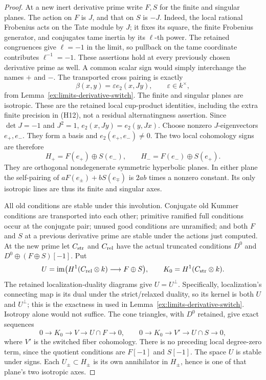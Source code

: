 \documentclass[11pt]{article}
\theoremstyle{definition}
\theoremstyle{remark}
\begin{document}
\begin{proof}
At a new inert derivative prime write $F,S$ for the finite and
singular planes. The action on $F$ is $J$, and that on $S$ is $-J$.
Indeed, the local rational Frobenius acts on the Tate module by $J$;
it fixes its square, the finite Frobenius generator, and conjugates
tame inertia by its $\ell$-th power. The retained congruences give
$\ell=-1$ in the limit, so pullback on the tame coordinate contributes
$\ell^{-1}=-1$. These assertions hold at every previously chosen
derivative prime as well. A common scalar sign would simply interchange
the names $+$ and $-$.
The transported cross pairing is exactly
\[
 \beta(x,y)=\varepsilon e_2(x,Jy),\qquad \varepsilon\in k^\times,
\]
from Lemma~\ref{ex:limits-derivative-switch}. The finite and singular
planes are isotropic. These are the retained local cup-product
identities, including the extra finite precision in (H12), not a
residual alternatingness assertion. Since $\det J=-1$ and $J^2=1$,
$e_2(x,Jy)=e_2(y,Jx)$. Choose nonzero $J$-eigenvectors $e_+,e_-$.
They form a basis and $e_2(e_+,e_-)\ne0$. The two local cohomology
signs are therefore
\[
 H_+=F(e_+)\oplus S(e_-),\qquad
 H_-=F(e_-)\oplus S(e_+).
\]
They are orthogonal nondegenerate symmetric hyperbolic planes.
In either plane the self-pairing of $aF(e_\pm)+bS(e_\mp)$ is
$2ab$ times a nonzero constant. Its only isotropic lines are thus
its finite and singular axes.

All old conditions are stable under this involution. Conjugate old
Kummer conditions are transported into each other; primitive ramified
full conditions occur at the conjugate pair; unused good conditions
are unramified; and both $F$ and $S$ at a previous derivative prime
are stable under the actions just computed. At the new prime let
$C_{\rm str}$ and $C_{\rm rel}$ have the actual truncated conditions
$D^0$ and $D^0\oplus(F\oplus S)[-1]$. Put
\[
 U=\operatorname{im}\bigl(H^1(C_{\rm rel}\otimes k)\longrightarrow
 F\oplus S\bigr),\qquad
 K_0=H^1(C_{\rm str}\otimes k).
\]
The retained localization-duality diagrams give $U=U^\perp$.
Specifically, localization's connecting map is its dual under the
strict/relaxed duality, so its kernel is both $U$ and $U^\perp$;
this is the exactness in \cite[6.3.3--6.3.4]{nekovar} used in
Lemma~\ref{ex:limits-derivative-switch}. Isotropy alone would not suffice.
The cone triangles, with $D^0$ retained, give exact sequences
\[
 0\longrightarrow K_0\longrightarrow V
   \longrightarrow U\cap F\longrightarrow0,
 \qquad
 0\longrightarrow K_0\longrightarrow V'
   \longrightarrow U\cap S\longrightarrow0,                 \tag{5.5a}
\]
where $V'$ is the switched fiber cohomology. There is no preceding
local degree-zero term, since the quotient conditions are
$F[-1]$ and $S[-1]$.
The space $U$ is stable under signs. Each $U_\pm\subset H_\pm$
is its own annihilator in $H_\pm$, hence is one of that plane's
two isotropic axes.


\end{proof}
\end{document}
